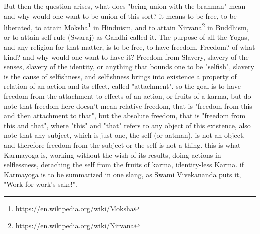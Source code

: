 \documentclass[a4paper]{article}
\begin{document}
But then the question arises, what does "being union with the brahman" mean and why would one want to be union of this sort? 
it means to be free, to be liberated, to attain 
Moksha\footnote{\href{https://en.wikipedia.org/wiki/Moksha}{https://en.wikipedia.org/wiki/Moksha}}
in Hinduism, and to attain 
Nirvana\footnote{\href{https://en.wikipedia.org/wiki/Nirvana}{https://en.wikipedia.org/wiki/Nirvana}}
in Buddhism, or to attain self-rule (Swaraj) as Gandhi called it. The purpose of all the Yogas, and any religion for that matter, is to be free, 
to have freedom. Freedom? of what kind? and why would one want to have it?
Freedom from Slavery, slavery of the senses, slavery of the identity, or anything that bounds one
to be "selfish", slavery is the cause of selfishness, and selfishness brings into existence a 
property of relation of an action and its effect, called "attachment". so the goal is to have freedom from the attachment 
to effects of an action, or fruits of a karma, but do note that freedom here doesn't mean
relative freedom, that is "freedom from this and then attachment to that", but the absolute freedom,
that is "freedom from this and that", where "this" and "that" refers to any object of this existence,
also note that any subject, which is just one, the self (or aatman), is not an object, and therefore freedom from the subject or
the self is not a thing. this is what Karmayoga is, working without the wish of its results,
doing actions in selflessness, detaching the self from the fruits of karma, identity-less Karma. 
if Karmayoga is to be summarized in one slang, as Swami Vivekananda puts it, "Work for work's sake!".
\end{document}
